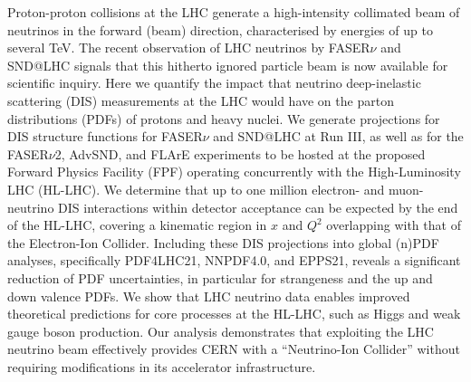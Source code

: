 \documentclass[11pt,a4paper]{article}
\numberwithin{equation}{section}
\numberwithin{figure}{section}
\numberwithin{table}{section}
\begin{document}
Proton-proton collisions at the LHC generate a high-intensity collimated beam of neutrinos
in the forward (beam) direction, characterised by energies of up to several TeV.
%
The recent  observation of LHC neutrinos by FASER$\nu$ and SND@LHC
signals that this hitherto ignored particle beam is now available for scientific inquiry.
%
Here we quantify the impact that neutrino deep-inelastic scattering (DIS)
measurements at the LHC would have
on the parton distributions (PDFs) of protons and heavy nuclei.
%
We generate projections for DIS structure functions
for FASER$\nu$ and SND@LHC at Run III,
as well as for the FASER$\nu$2, AdvSND, and FLArE experiments
to be  hosted at the proposed
Forward Physics Facility (FPF) operating concurrently with the High-Luminosity LHC (HL-LHC).
%
We determine that up to one million electron- and muon-neutrino DIS interactions
within detector acceptance can be expected by the end of the HL-LHC,
covering a kinematic region in $x$ and $Q^2$ overlapping with that
of the Electron-Ion Collider.
%
Including these DIS projections into
global (n)PDF analyses, specifically PDF4LHC21, NNPDF4.0,
and EPPS21,  reveals a significant reduction of PDF uncertainties, in particular
for strangeness and the up and down valence PDFs.
%
We show that LHC neutrino data enables improved theoretical
predictions for core processes at the HL-LHC, such as Higgs and weak gauge
boson production.
%
Our analysis demonstrates that exploiting the LHC neutrino beam effectively
provides CERN with a ``Neutrino-Ion Collider''
without  requiring modifications in its accelerator infrastructure.


\clearpage

\tableofcontents





\appendix




%

\end{document}
